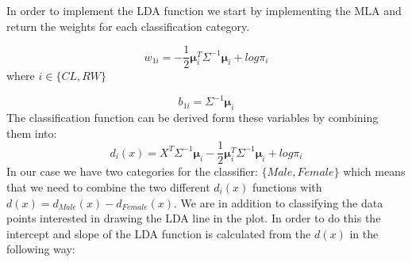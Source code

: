 \documentclass[a4paper,12pt]{article}
\begin{document}
In order to implement the LDA function we start by implementing the MLA and return the weights for each classification category. 

\begin{equation}
    w_{1i} = -\frac{1}{2}\mathbf{\mu}^{T}_i\Sigma^{-1}\mathbf{\mu}_i+log \pi_i
\end{equation}
where $i \in \{CL,RW\}$

\begin{equation}
    b_{1i} = \Sigma^{-1}\mathbf{\mu}_i
\end{equation}
The classification function can be derived form these variables by combining them into:
\begin{equation}
  d_i(x) = X^T \Sigma^{-1}\mathbf{\mu}_i -\frac{1}{2}\mathbf{\mu}^{T}_i\Sigma^{-1}\mathbf{\mu}_i+log \pi_i
\end{equation}
In our case we have two categories for the classifier: $\{Male,Female\}$ which means that we need to combine the two different $d_i(x)$ functions with $d(x) = d_{Male}(x) - d_{Female}(x)$. We are in addition to classifying the data points interested in drawing the LDA line in the plot. In order to do this the intercept and slope of the LDA function is calculated from the $d(x)$ in the following way:
\end{document}
